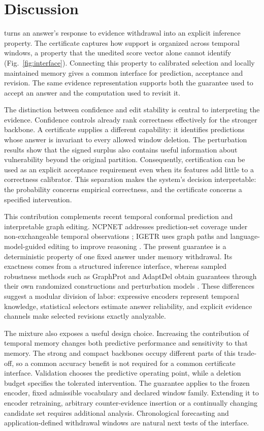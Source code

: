 \section{Discussion}
\StableKG{} turns an answer's response to evidence withdrawal into an explicit inference property. The certificate captures how support is organized across temporal windows, a property that the unedited score vector alone cannot identify (Fig.~\ref{fig:interface}). Connecting this property to calibrated selection and locally maintained memory gives a common interface for prediction, acceptance and revision. The same evidence representation supports both the guarantee used to accept an answer and the computation used to revisit it.

The distinction between confidence and edit stability is central to interpreting the evidence. Confidence controls already rank correctness effectively for the stronger backbone. A certificate supplies a different capability: it identifies predictions whose answer is invariant to every allowed window deletion. The perturbation results show that the signed surplus also contains useful information about vulnerability beyond the original partition. Consequently, certification can be used as an explicit acceptance requirement even when its features add little to a correctness calibrator. This separation makes the system's decision interpretable: the probability concerns empirical correctness, and the certificate concerns a specified intervention.

This contribution complements recent temporal conformal prediction and interpretable graph editing. NCPNET addresses prediction-set coverage under non-exchangeable temporal observations \citep{wang2025nonexchangeable}; IGETR uses graph paths and language-model-guided editing to improve reasoning \citep{fan2026editing}. The present guarantee is a deterministic property of one fixed answer under memory withdrawal. Its exactness comes from a structured inference interface, whereas sampled robustness methods such as GraphProt and AdaptDel obtain guarantees through their own randomized constructions and perturbation models \citep{yang2025graphprot,huang2025adaptdel}. These differences suggest a modular division of labor: expressive encoders represent temporal knowledge, statistical selectors estimate answer reliability, and explicit evidence channels make selected revisions exactly analyzable.

The mixture also exposes a useful design choice. Increasing the contribution of temporal memory changes both predictive performance and sensitivity to that memory. The strong and compact backbones occupy different parts of this trade-off, so a common accuracy benefit is not required for a common certificate interface. Validation chooses the predictive operating point, while a deletion budget specifies the tolerated intervention. The guarantee applies to the frozen encoder, fixed admissible vocabulary and declared window family. Extending it to encoder retraining, arbitrary counter-evidence insertion or a continually changing candidate set requires additional analysis. Chronological forecasting and application-defined withdrawal windows are natural next tests of the interface.

